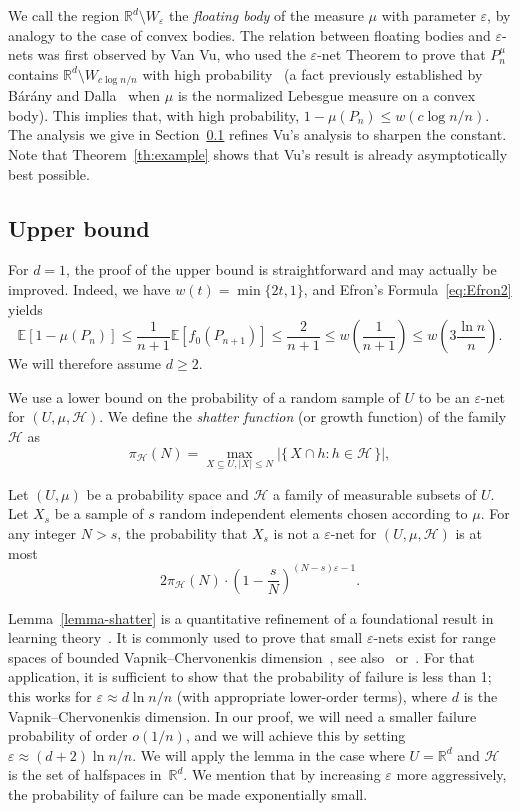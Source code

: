 \documentclass[AHL,Unicode,longabstracts]{cedram}
\newcommand{\eps}{\varepsilon}
\newcommand{\Rbb}{\mathbb{R}}%
\newcommand{\Ebb}{\mathbb{E}}%
\newcommand{\Hcal}{\mathcal{H}} %
\newcommand{\pth}[1]{\left(#1 \right)}
\newcommand{\ptb}[1]{\left[#1 \right]}
\newcommand*{\mtfrac}[2]{\frac{#1}{#2}}%
\begin{document}
We call the region $\Rbb^d\setminus W_\eps$ the \emph{floating body} of the measure $\mu$ with parameter $\eps$, by analogy to the case of convex bodies. The relation between floating bodies and $\eps$-nets was first observed by Van Vu, who used the $\eps$-net Theorem to prove that $P_n^{\mu}$ contains $\Rbb^d \setminus W_{c\log n/n}$ with high probability~\cite[Lemma~4.2]{VanVu} (a fact previously established by Bárány and Dalla~\cite{BD} when $\mu$ is the normalized Lebesgue measure on a convex body). This implies that, with high probability, $1-\mu(P_n)\le w(c\log n/n)$. The analysis we give in Section~\ref{sec:upperbound} refines Vu's analysis to sharpen the constant. Note that Theorem~\ref{th:example} shows that Vu's result is already asymptotically best possible.


\subsection{Upper bound}\label{sec:upperbound}


For $d=1$, the proof of the upper bound is straightforward and may actually be improved. Indeed, we have $w(t)=\min\{2t,1\}$, and Efron's Formula~\eqref{eq:Efron2} yields
\[
\Ebb\ptb{1-\mu(P_n)} \le \frac1{n+1} \Ebb\ptb{f_0(P_{n+1})} \le \frac2{n+1} \le w\pth{\frac{1}{n+1}} \le w\pth{3 \frac{\ln n}{n}}.
\]
We will therefore assume $d\ge2$.

We use a lower bound on the probability of a random sample of $U$ to be an $\eps$-net for $(U, \mu, \Hcal)$. We define the \emph{shatter function} (or growth function) of the family $\Hcal$ as
\[
\pi_{\Hcal}(N) = \max_{X\subseteq U, |X|\le N} |\{\, X\cap h : h \in \Hcal\,\}|,
\]

\begin{lemm}\label{lemma-shatter}
Let $(U,\mu)$ be a probability space and $\Hcal$ a family of measurable subsets of $U$. Let $X_s$ be a sample of $s$ random independent elements chosen according to $\mu$. For any integer $N> s$, the probability that $X_s$ is not a $\eps$-net for $(U,\mu,\Hcal)$ is at most
\begin{equation}
\nonumber 2\pi_{\Hcal}(N) \cdot \left(1-\mtfrac{s}{N}\right)^{(N-s)\eps-1}.
\end{equation}
\end{lemm}

Lemma~\ref{lemma-shatter} is a quantitative refinement of a foundational result in learning theory~\cite[Theorem~2]{VC}. It is commonly used to prove that small $\eps$-nets exist for range spaces of bounded Vapnik--Chervonenkis dimension~\cite{HW}, see also~\cite[Theorem~3.1]{KPW} or~\cite[Theorem~15.5] {Pach}. For that application, it is sufficient to show that the probability of failure is less than 1; this works for $\eps\approx d \ln n/n$ (with appropriate lower-order terms), where $d$ is the Vapnik--Chervonenkis dimension. In our proof, we will need a smaller failure probability of order $o(1/n)$, and we will achieve this by setting $\eps\approx (d+2) \ln n/n$. We will apply the lemma in the case where $U = \Rbb^d$ and $\Hcal$ is the set of halfspaces in~$\Rbb^d$. We mention that by increasing $\eps$ more aggressively, the probability of failure can be made exponentially small.
\end{document}

